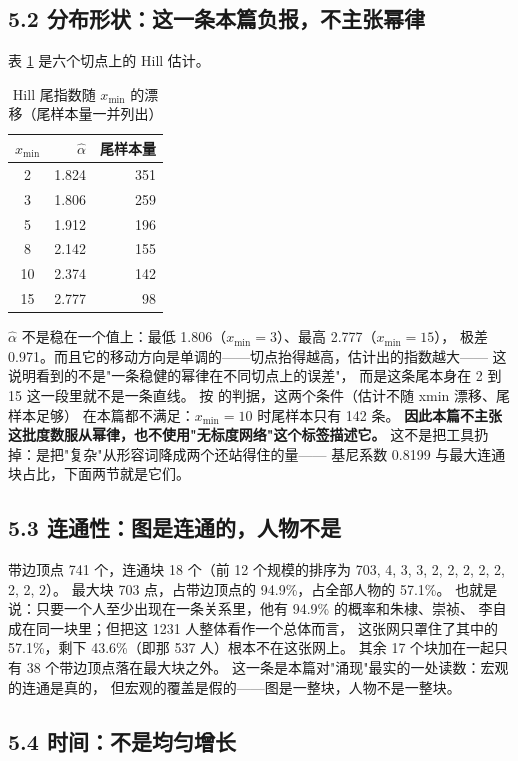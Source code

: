 \subsection{5.2 分布形状：这一条本篇负报，不主张幂律}

表 \ref{tab:alpha} 是六个切点上的 Hill 估计。

\begin{table}[!t]
\centering
\caption{Hill 尾指数随 $x_{\min}$ 的漂移（尾样本量一并列出）}
\label{tab:alpha}
\small
\begin{tabular}{crr}
\toprule
$x_{\min}$ & $\hat\alpha$ & 尾样本量 \\
\midrule
2 & 1.824 & 351 \\
3 & 1.806 & 259 \\
5 & 1.912 & 196 \\
8 & 2.142 & 155 \\
10 & 2.374 & 142 \\
15 & 2.777 & 98 \\
\bottomrule
\end{tabular}
\end{table}

$\hat\alpha$ 不是稳在一个值上：最低 1.806（$x_{\min}=3$）、最高 2.777（$x_{\min}=15$），
极差 0.971。而且它的移动方向是单调的——切点抬得越高，估计出的指数越大——
这说明看到的不是"一条稳健的幂律在不同切点上的误差"，
而是这条尾本身在 2 到 15 这一段里就不是一条直线。
按 \citet{clauset2009} 的判据，这两个条件（估计不随 xmin 漂移、尾样本足够）
在本篇都不满足：$x_{\min}=10$ 时尾样本只有 142 条。
\textbf{因此本篇不主张这批度数服从幂律，也不使用"无标度网络"这个标签描述它。}
这不是把工具扔掉：是把"复杂"从形容词降成两个还站得住的量——
基尼系数 0.8199 与最大连通块占比，下面两节就是它们。

\subsection{5.3 连通性：图是连通的，人物不是}

带边顶点 741 个，连通块 18 个（前 12 个规模的排序为 703, 4, 3, 3, 2, 2, 2, 2, 2, 2, 2, 2）。
最大块 703 点，占带边顶点的 94.9\%，占全部人物的 57.1\%。
也就是说：只要一个人至少出现在一条关系里，他有 94.9\% 的概率和朱棣、崇祯、
李自成在同一块里；但把这 1231 人整体看作一个总体而言，
这张网只罩住了其中的 57.1\%，剩下 43.6\%（即那 537 人）根本不在这张网上。
其余 17 个块加在一起只有 38 个带边顶点落在最大块之外。
这一条是本篇对"涌现"最实的一处读数：宏观的连通是真的，
但宏观的覆盖是假的——图是一整块，人物不是一整块。

\subsection{5.4 时间：不是均匀增长}

